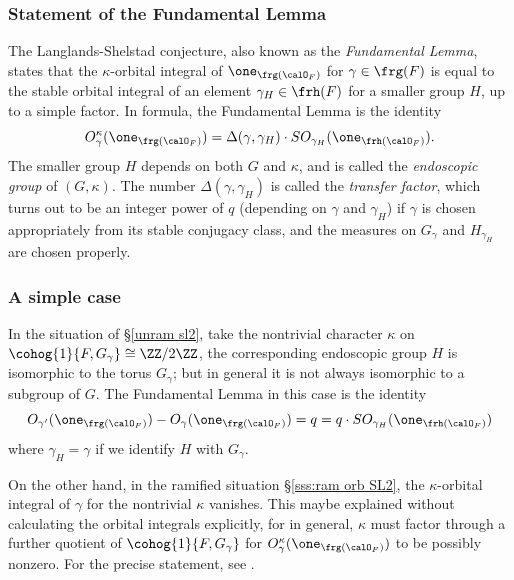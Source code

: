 \subsubsection{Statement of the Fundamental Lemma} The Langlands-Shelstad conjecture, also known as the {\em Fundamental Lemma}, states that the $\kappa$-orbital integral of $\one_{\frg(\calO_{F})}$ for $\gamma\in\frg(F)$ is equal to the stable orbital integral of an element $\gamma_{H}\in\frh(F)$ for a smaller group $H$, up to a simple factor. In formula, the Fundamental Lemma is the identity
\begin{equation*}
O^{\kappa}_{\gamma}(\one_{\frg(\calO_{F})})=\Delta(\gamma,\gamma_{H})\cdot SO_{\gamma_{H}}(\one_{\frh(\calO_{F})}).
\end{equation*}
The smaller group $H$ depends on both $G$ and $\kappa$, and is called the {\em endoscopic group} of $(G,\kappa)$. The number $\Delta(\gamma,\gamma_{H})$ is called the {\em transfer factor}, which turns out to be an integer power of $q$ (depending on $\gamma$ and $\gamma_{H}$) if $\gamma$ is chosen appropriately from its stable conjugacy class, and the measures on $G_{\gamma}$ and $H_{\gamma_{H}}$ are chosen properly.


\subsubsection{A simple case} In the situation of \S\ref{unram sl2}, take the nontrivial character $\kappa$ on $\cohog{1}{F,G_{\gamma}}\cong\ZZ/2\ZZ$, the corresponding endoscopic group $H$ is isomorphic to the torus $G_{\gamma}$; but in general it is not always isomorphic to a subgroup of $G$. The Fundamental Lemma in this case is the identity
\begin{equation*}
O_{\gamma'}(\one_{\frg(\calO_{F})})-O_{\gamma}(\one_{\frg(\calO_{F})})=q=q\cdot SO_{\gamma_{H}}(\one_{\frh(\calO_{F})})
\end{equation*}
where $\gamma_{H}=\gamma$ if we identify $H$ with $G_{\gamma}$. 

On the other hand, in the ramified situation \S\ref{sss:ram orb SL2}, the $\kappa$-orbital integral of $\gamma$ for the nontrivial $\kappa$ vanishes. This maybe explained without calculating the orbital integrals explicitly, for in general, $\kappa$ must factor through a further quotient of $\cohog{1}{F,G_{\gamma}}$ for $O^{\kappa}_{\gamma}(\one_{\frg(\calO_{F})})$ to be possibly nonzero. For the precise statement, see \cite[Prop 8.2.7]{NgoFL}.

